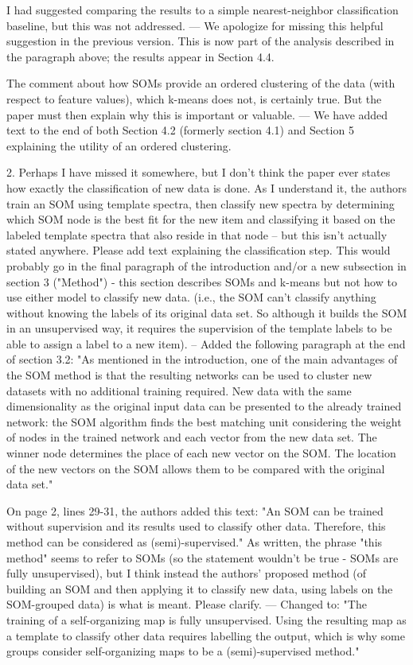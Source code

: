 I had suggested comparing the results to a simple nearest-neighbor classification baseline, but this was not addressed.
--- We apologize for missing this helpful suggestion in the previous version. This is now part of the analysis described in the paragraph above; the results appear in Section 4.4.

The comment about how SOMs provide an ordered clustering of the data (with respect to feature values), which k-means does not, is certainly true.  But the paper must then explain why this is important or valuable.
--- We have added text to the end of both Section 4.2 (formerly section 4.1) and Section 5 explaining the utility of an ordered clustering.

2. Perhaps I have missed it somewhere, but I don't think the paper ever states how exactly the classification of new data is done.  As I understand it, the authors train an SOM using template spectra, then classify new spectra by determining which SOM node is the best fit for the new item and classifying it based on the labeled template spectra that also reside in that node -- but this isn't actually stated anywhere.  Please add text explaining the classification step.  This would probably go in the final paragraph of the introduction and/or a new subsection in section 3 ("Method") - this section describes SOMs and k-means but not how to use either model to classify new data. (i.e., the SOM can't classify anything without knowing the labels of its original data set.  So although it builds the SOM in an unsupervised way, it requires the supervision of the template labels to be able to assign a label to a new item).
-- Added the following paragraph  at the end of section 3.2: 
    "As mentioned in the introduction, one of the main advantages of the SOM method  is that the resulting networks can be used to cluster new datasets with no additional training required. 
     New data with the same dimensionality as the original input data can be presented to the already trained network: the SOM algorithm finds the best matching unit considering the weight of nodes in the trained network and each vector from the new data set.
     The winner node determines the place of each new vector on the SOM.
     The location of the new vectors on the SOM allows them to be compared with the original data set."

On page 2, lines 29-31, the authors added this text: "An SOM can be trained without supervision and its results used to classify other data. Therefore, this method can be considered as (semi)-supervised." As written, the phrase "this method" seems to refer to SOMs (so the statement wouldn't be true - SOMs are fully unsupervised), but I think instead the authors' proposed method (of building an SOM and then applying it to classify new data, using labels on the SOM-grouped data) is what is meant.  Please clarify.
--- Changed to: 
    "The training of a self-organizing map is fully unsupervised.
     Using the resulting map as a template to classify other data requires labelling the output, which is why some groups consider self-organizing maps to be a (semi)-supervised method."

